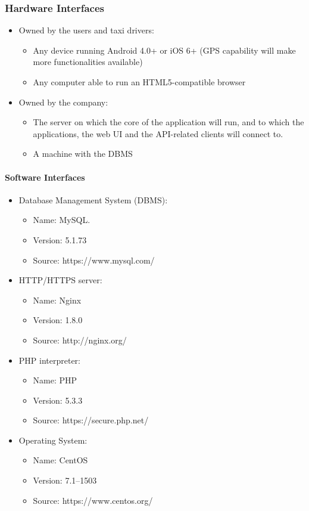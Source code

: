 \documentclass{article}
\begin{document}
\subsubsection{Hardware Interfaces}
\begin{itemize}
	\item Owned by the users and taxi drivers:
		\begin{itemize}
			\item Any device running Android 4.0+ or iOS 6+ (GPS capability will make more functionalities available)
			\item Any computer able to run an HTML5-compatible browser 
		\end{itemize}
	\item Owned by the company:
		\begin{itemize}
			\item The server on which the core of the application will run, and to which the applications, 
				the web UI and the API-related clients will connect to.
			\item A machine with the DBMS 
		\end{itemize}
\end{itemize}
\paragraph{Software Interfaces}
\begin{itemize}
	\item Database Management System (DBMS):
		\begin{itemize}
			\item Name: MySQL.\@
			\item Version: 5.1.73 
			\item Source: https://www.mysql.com/
		\end{itemize}
	\item HTTP/HTTPS server:
		\begin{itemize}
			\item Name: Nginx
			\item Version: 1.8.0 
			\item Source: http://nginx.org/
		\end{itemize}
	\item PHP interpreter:
		\begin{itemize}
			\item Name: PHP
			\item Version: 5.3.3 
			\item Source: https://secure.php.net/
		\end{itemize}
	\item Operating System: 
		\begin{itemize}
			\item Name: CentOS
			\item Version: 7.1--1503 
			\item Source: https://www.centos.org/ 
		\end{itemize}
\end{itemize}
\end{document}
